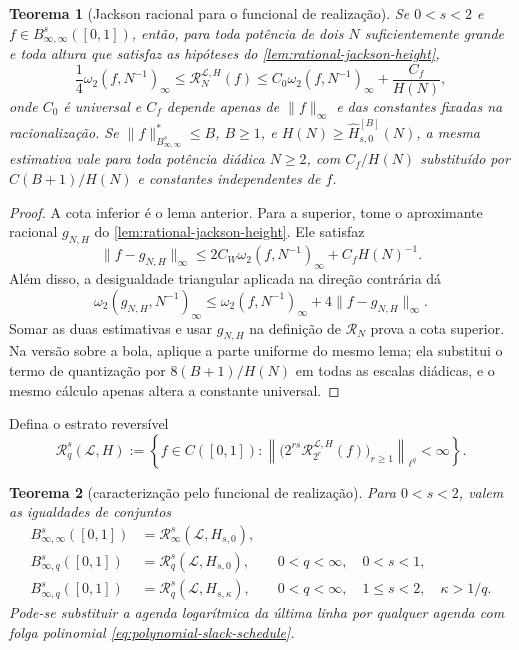 \documentclass[11pt,a4paper]{article}
\newtheorem{theorem}{Teorema}[section]
\theoremstyle{definition}
\theoremstyle{remark}
\newcommand{\Library}{\mathcal{L}}
\begin{document}
\begin{theorem}[Jackson racional para o funcional de realização]
\label{thm:regularized-jackson-bernstein}
Se $0<s<2$ e $f\in B^s_{\infty,\infty}([0,1])$, então, para toda potência de
dois $N$ suficientemente grande e toda altura que satisfaz as hipóteses do
\cref{lem:rational-jackson-height},
\begin{equation}
 \frac14\omega_2(f,N^{-1})_\infty
 \le \mathcal R_N^{\Library,H}(f)
 \le C_0\omega_2(f,N^{-1})_\infty+\frac{C_f}{H(N)},
 \label{eq:two-sided-regularized-equivalence}
\end{equation}
onde $C_0$ é universal e $C_f$ depende apenas de $\|f\|_\infty$ e das
constantes fixadas na racionalização.
Se $\|f\|_{B^s_{\infty,\infty}}^*\le B$, $B\ge1$, e
$H(N)\ge\widehat H_{s,0}^{[B]}(N)$, a mesma estimativa vale para toda potência
diádica $N\ge2$, com $C_f/H(N)$ substituído por $C(B+1)/H(N)$ e constantes
independentes de $f$.
\end{theorem}

\begin{proof}
A cota inferior é o lema anterior. Para a superior, tome o aproximante
racional $g_{N,H}$ do \cref{lem:rational-jackson-height}. Ele satisfaz
\[
 \|f-g_{N,H}\|_\infty
 \le2C_W\omega_2(f,N^{-1})_\infty+C_fH(N)^{-1}.
\]
Além disso, a desigualdade triangular aplicada na direção contrária dá
\[
 \omega_2(g_{N,H},N^{-1})_\infty
 \le\omega_2(f,N^{-1})_\infty+4\|f-g_{N,H}\|_\infty.
\]
Somar as duas estimativas e usar $g_{N,H}$ na definição de
$\mathcal R_N$ prova a cota superior. Na versão sobre a bola, aplique a parte
uniforme do mesmo lema; ela substitui o termo de quantização por
$8(B+1)/H(N)$ em todas as escalas diádicas, e o mesmo cálculo apenas altera a
constante universal.
\end{proof}

Defina o estrato reversível
\begin{equation}
 \mathscr R_q^s(\Library,H)
 :=\left\{f\in C([0,1]):
 \left\|\bigl(2^{rs}\mathcal R_{2^r}^{\Library,H}(f)\bigr)_{r\ge1}
 \right\|_{\ell^q}<\infty\right\}.
 \label{eq:reversible-stratum}
\end{equation}

\begin{theorem}[caracterização pelo funcional de realização]
\label{thm:complete-besov-reversibility}
Para $0<s<2$, valem as igualdades de conjuntos
\begin{align}
 B^s_{\infty,\infty}([0,1])
 &=\mathscr R_\infty^s(\Library,H_{s,0}),
 \label{eq:complete-reverse-endpoint}\\
 B^s_{\infty,q}([0,1])
 &=\mathscr R_q^s(\Library,H_{s,0}),
 &&0<q<\infty,\quad0<s<1,
 \label{eq:complete-reverse-subcritical}\\
 B^s_{\infty,q}([0,1])
 &=\mathscr R_q^s(\Library,H_{s,\kappa}),
 &&0<q<\infty,\quad1\le s<2,\quad\kappa>1/q.
 \label{eq:complete-reverse-critical}
\end{align}
Pode-se substituir a agenda logarítmica da última linha por qualquer agenda
com folga polinomial \eqref{eq:polynomial-slack-schedule}.
\end{theorem}
\end{document}

